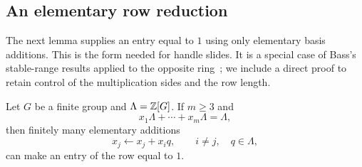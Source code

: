 \subsection{An elementary row reduction}

The next lemma supplies an entry equal to $1$ using only elementary
basis additions.  This is the form needed for handle slides.  It is a
special case of Bass's stable-range results applied to the opposite
ring~\cite[Lemma~6.4 and Theorems~4.2(a),~11.1]{Bass}; we include a direct
proof to retain control of the multiplication sides and the row length.

\begin{lemma}\label{lem:row}
Let $G$ be a finite group and $\Lambda=\mathbb Z[G]$.  If $m\ge3$ and
\[
  x_1\Lambda+\cdots+x_m\Lambda=\Lambda,
\]
then finitely many elementary additions
\[
  x_j\longleftarrow x_j+x_iq,
  \qquad i\ne j,\quad q\in\Lambda,
\]
can make an entry of the row equal to $1$.
\end{lemma}

